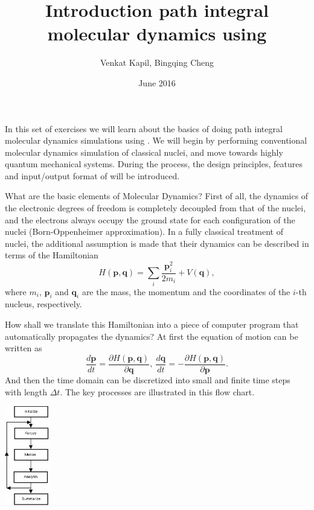 \documentclass{article}
\title{Introduction path integral \\molecular dynamics using \ipi{}}
\author{Venkat Kapil, Bingqing Cheng}
\date{June 2016}
\begin{document}
\maketitle

In this set of exercises we will learn 
about the basics of doing path integral 
molecular dynamics simulations using \ipi{}. 
We will begin by performing conventional
molecular dynamics simulation of classical nuclei,
and move towards highly quantum mechanical systems.
During the process, the design principles, 
features and input/output format of \ipi{} 
will be introduced.

\begin{Exercise}[label={basic},title={Molecular Dynamics simulations doing in a different way:  server and clients}]

What are the basic elements of Molecular Dynamics? 
First of all, the dynamics of the electronic
degrees of freedom is completely decoupled from that of the nuclei, and the electrons always
occupy the ground state for each configuration of the nuclei (Born-Oppenheimer
approximation). 
In a fully classical treatment of nuclei, the
additional assumption is made that their 
dynamics can be described in terms of the 
Hamiltonian
\begin{equation}
    H(\textbf{p},\textbf{q})=\sum_i \dfrac{\textbf{p}_i^2}{2 m_i} + V(\textbf{q}),
\end{equation}
where $m_i$, $\textbf{p}_i$ and $\textbf{q}_i$ 
are the mass, the momentum and the coordinates of the $i$-th nucleus, respectively.

How shall we translate this Hamiltonian into a 
piece of computer program that automatically 
propagates the dynamics?
At first the equation of motion can be written as
\begin{equation}
   \dfrac{d \textbf{p}}{d t}= 
   \dfrac{\partial H(\textbf{p},\textbf{q})}{\partial \textbf{q}},
   ~\dfrac{d \textbf{q}}{d t}= 
   -\dfrac{\partial H(\textbf{p},\textbf{q})}{\partial \textbf{p}}.
\end{equation}
And then the time domain can be discretized into small  and finite time steps with length $\Delta t$.
The key processes are illustrated in this flow chart.

\centering
    \includegraphics[width=0.15\textwidth]{mdchart.jpg}


\end{Exercise}
\end{document}
